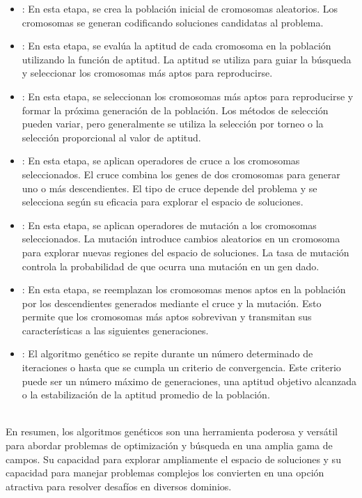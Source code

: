 \begin{itemize}

\item {}: En esta etapa, se crea la población inicial de cromosomas aleatorios. Los cromosomas se generan codificando soluciones candidatas al problema.

\item {}: En esta etapa, se evalúa la aptitud de cada cromosoma en la población utilizando la función de aptitud. La aptitud se utiliza para guiar la búsqueda y seleccionar los cromosomas más aptos para reproducirse.

\item {}: En esta etapa, se seleccionan los cromosomas más aptos para reproducirse y formar la próxima generación de la población. Los métodos de selección pueden variar, pero generalmente se utiliza la selección por torneo o la selección proporcional al valor de aptitud.

\item {}: En esta etapa, se aplican operadores de cruce a los cromosomas seleccionados. El cruce combina los genes de dos cromosomas para generar uno o más descendientes. El tipo de cruce depende del problema y se selecciona según su eficacia para explorar el espacio de soluciones.

\item {}: En esta etapa, se aplican operadores de mutación a los cromosomas seleccionados. La mutación introduce cambios aleatorios en un cromosoma para explorar nuevas regiones del espacio de soluciones. La tasa de mutación controla la probabilidad de que ocurra una mutación en un gen dado.

\item {}: En esta etapa, se reemplazan los cromosomas menos aptos en la población por los descendientes generados mediante el cruce y la mutación. Esto permite que los cromosomas más aptos sobrevivan y transmitan sus características a las siguientes generaciones.

\item {}: El algoritmo genético se repite durante un número determinado de iteraciones o hasta que se cumpla un criterio de convergencia. Este criterio puede ser un número máximo de generaciones, una aptitud objetivo alcanzada o la estabilización de la aptitud promedio de la población.
\end{itemize}
\\
En resumen, los algoritmos genéticos son una herramienta poderosa y versátil para abordar problemas de optimización y búsqueda en una amplia gama de campos. Su capacidad para explorar ampliamente el espacio de soluciones y su capacidad para manejar problemas complejos los convierten en una opción atractiva para resolver desafíos en diversos dominios.

